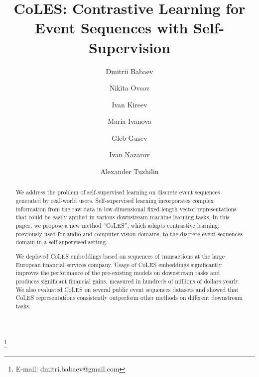 \documentclass[sigconf]{acmart}
\begin{document}
\fancyhead{}

\title{CoLES: Contrastive Learning for Event Sequences with Self-Supervision}

\author{Dmitrii Babaev} \thanks{E-mail: dmitri.babaev@gmail.com}


\author{Nikita Ovsov} 
\author{Ivan Kireev} 
\author{Maria Ivanova}

    
\author{Gleb Gusev}

\author{Ivan Nazarov}


\author{Alexander Tuzhilin}

\begin{abstract}
We address the problem of self-supervised learning on discrete event sequences generated by real-world users. Self-supervised learning incorporates complex information from the raw data in low-dimensional fixed-length vector representations that could be easily applied in various downstream machine learning tasks. In this paper, we propose a new method ``CoLES'', which adapts contrastive learning, previously used for audio and computer vision domains, to the discrete event sequences domain in a self-supervised setting.

We deployed CoLES embeddings based on sequences of transactions at the large European financial services company. Usage of CoLES embeddings significantly improves the performance of the pre-existing models on downstream tasks and produces significant financial gains, measured in hundreds of millions of dollars yearly.
% 
We also evaluated CoLES on several public event sequences datasets and showed that CoLES representations consistently outperform other methods on different downstream tasks.
\end{abstract}
\end{document}
